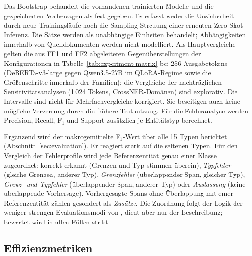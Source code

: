Das Bootstrap behandelt die vorhandenen trainierten Modelle und die
gespeicherten Vorhersagen als fest gegeben. Es erfasst weder die Unsicherheit
durch neue Trainingsläufe noch die Sampling-Streuung einer erneuten
Zero-Shot-Inferenz. Die Sätze werden als unabhängige Einheiten behandelt;
Abhängigkeiten innerhalb von Quelldokumenten werden nicht modelliert.
Als Hauptvergleiche gelten die aus FF1 und FF2 abgeleiteten
Gegenüberstellungen der Konfigurationen in
Tabelle~\ref{tab:experiment-matrix} bei 256 Ausgabetokens
(DeBERTa-v3-large gegen Qwen3.5-27B im QLoRA-Regime sowie die
Größenschritte innerhalb der Familien); die Vergleiche der nachträglichen Sensitivitätsanalysen
(1\,024 Tokens, CrossNER-Domänen) sind explorativ.
Die Intervalle sind nicht für Mehrfachvergleiche korrigiert. Sie beseitigen auch
keine mögliche Verzerrung durch die frühere Testnutzung.
Für die Fehleranalyse werden Precision, Recall, F$_1$ und Support zusätzlich
je Entitätstyp berechnet.

Ergänzend wird der makrogemittelte F$_1$-Wert über alle 15 Typen
berichtet (Abschnitt~\ref{sec:evaluation}). Er reagiert stark auf die
seltenen Typen.
Für den Vergleich der Fehlerprofile wird jede Referenzentität genau einer
Klasse zugeordnet: korrekt erkannt (Grenzen und Typ stimmen überein),
\emph{Typfehler} (gleiche Grenzen, anderer Typ), \emph{Grenzfehler}
(überlappender Span, gleicher Typ), \emph{Grenz- und Typfehler}
(überlappender Span, anderer Typ) oder \emph{Auslassung} (keine
überlappende Vorhersage).
Vorhergesagte Spans ohne Überlappung mit einer Referenzentität zählen
gesondert als \emph{Zusätze}.
Die Zuordnung folgt der Logik der weniger strengen Evaluationsmodi von
\textcite{segura2013semeval}, dient aber nur der Beschreibung; bewertet
wird in allen Fällen strikt.

\subsection{Effizienzmetriken}
\label{sec:effizienzmetriken}

